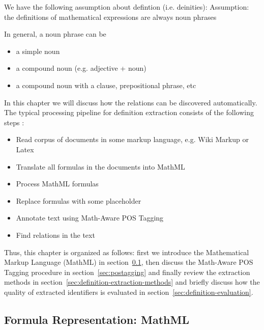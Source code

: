 We have the following assumption about defintion (i.e. deinities): 
Assumption: the definitions of mathematical expressions are always noun phrases

In general, a noun phrase can be

\begin{itemize}
\itemsep1pt\parskip0pt
  \item a simple noun
  \item a compound noun (e.g. adjective + noun)
  \item a compound noun with a clause, prepositional phrase, etc
\end{itemize}



In this chapter we will discuss how the relations can be discovered automatically. 
The typical processing pipeline for definition extraction consists of 
the following steps \cite{kristianto2012extracting} \cite{pagael2014mlp}:

\begin{itemize}
\itemsep1pt\parskip0pt
  \item Read corpus of documents in some markup language, e.g. Wiki Markup or Latex
  \item Translate all formulas in the documents into MathML
  \item Process MathML formulas
  \item Replace formulas with some placeholder
  \item Annotate text using Math-Aware POS Tagging
  \item Find relations in the text
\end{itemize}


Thus, this chapter is organized as follows: first we introduce the 
Mathematical Markup Language (MathML) in section~\ref{sec:mathml}, then discuss 
the Math-Aware POS Tagging procedure in section~\ref{sec:postagging} and 
finally review the extraction methods in section~\ref{sec:definition-extraction-methods}
and briefly discuss how the quality of extracted identifiers is evaluated
in section~\ref{sec:definition-evaluation}. 




\subsection{Formula Representation: MathML} \label{sec:mathml}


